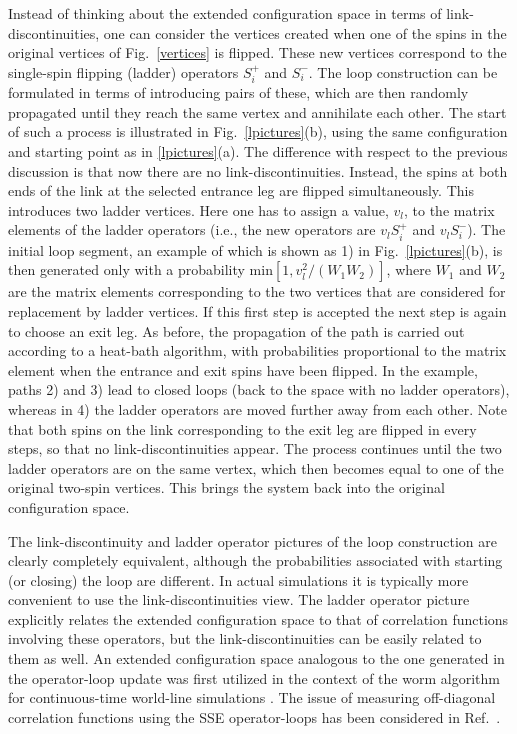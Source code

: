 \documentclass[10pt,pre,aps,twocolumn,showpacs,superscriptaddress,
floatfix]{revtex4}
\begin{document}
Instead of thinking about the extended configuration space in terms of
link-discontinuities, one can consider the vertices created when one of 
the spins in the original vertices of Fig.~\ref{vertices} is flipped. 
These new vertices correspond to the single-spin flipping (ladder) 
operators $S^+_i$ and $S^-_i$. The loop construction can be formulated
in terms of introducing pairs of these, which are then randomly propagated 
until they reach the same vertex and annihilate each other. The start of such
a process is illustrated in Fig.~\ref{lpictures}(b), using the same 
configuration and starting point as in \ref{lpictures}(a). The difference 
with respect to the previous discussion is that now there are no 
link-discontinuities. Instead, the spins at both ends of the link 
at the selected entrance leg are flipped simultaneously. 
This introduces two ladder vertices. Here one has to assign a value, $v_l$, 
to the matrix elements of the ladder operators (i.e., the new operators 
are $v_lS^+_i$ and $v_lS^-_i$). The initial loop segment, an example of which 
is shown as 1) in Fig.~\ref{lpictures}(b), is then generated only with a 
probability min$[1,v_l^2/(W_1W_2)]$, where $W_1$ and $W_2$ are the matrix 
elements corresponding to the two vertices that are considered for replacement 
by ladder vertices. If this first step is accepted the next step is again to 
choose an exit leg. As before, the propagation of the path is carried out 
according to a heat-bath algorithm, with probabilities proportional to the 
matrix element when the entrance and exit spins have been flipped. In the 
example, paths 2) and 3) lead to closed loops (back to the space with no ladder
operators), whereas in 4) the ladder operators are moved further away from 
each other. Note that both spins on the link corresponding to the exit leg 
are flipped in every steps, so that no link-discontinuities appear. The 
process continues until the two ladder operators are on the same vertex, 
which then becomes equal to one of the original two-spin vertices. This 
brings the system back into the original configuration space.

The link-discontinuity and ladder operator pictures of the loop construction 
are clearly completely equivalent, although the probabilities associated with 
starting (or closing) the loop are different. In actual simulations it is 
typically more convenient to use the link-discontinuities view. The ladder 
operator picture explicitly relates the extended configuration space to that 
of correlation functions involving these operators, but the 
link-discontinuities can be easily related to them as well. An extended 
configuration space analogous 
to the one generated in the operator-loop update was first utilized in the 
context of the worm algorithm for continuous-time world-line simulations 
\cite{prokofev}. The issue of measuring off-diagonal correlation functions 
using the SSE operator-loops has been considered in Ref.~\cite{dorneich2}. 
\end{document}
